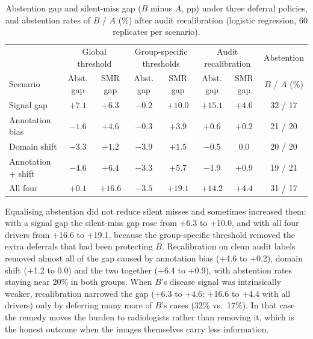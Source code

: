 \begin{table}[t]
\centering
\caption{Abstention gap and silent-miss gap ($B$ minus $A$, pp) under three deferral policies, and abstention rates of $B$ / $A$ (\%) after audit recalibration (logistic regression, 60 replicates per scenario).}
\label{tab:mitig}
\footnotesize
\begin{tabular}{@{}lccccccc@{}}
\toprule
 & \multicolumn{2}{c}{Global threshold} & \multicolumn{2}{c}{Group-specific thresholds} & \multicolumn{2}{c}{Audit recalibration} & Abstention \\
Scenario & Abst. gap & SMR gap & Abst. gap & SMR gap & Abst. gap & SMR gap & $B$ / $A$ (\%) \\
\midrule
Signal gap & $+7.1$ & $+6.3$ & $-0.2$ & $+10.0$ & $+15.1$ & $+4.6$ & 32 / 17 \\
Annotation bias & $-1.6$ & $+4.6$ & $-0.3$ & $+3.9$ & $+0.6$ & $+0.2$ & 21 / 20 \\
Domain shift & $-3.3$ & $+1.2$ & $-3.9$ & $+1.5$ & $-0.5$ & $0.0$ & 20 / 20 \\
Annotation + shift & $-4.6$ & $+6.4$ & $-3.3$ & $+5.7$ & $-1.9$ & $+0.9$ & 19 / 21 \\
All four & $+0.1$ & $+16.6$ & $-3.5$ & $+19.1$ & $+14.2$ & $+4.4$ & 31 / 17 \\
\bottomrule
\end{tabular}
\end{table}

Equalising abstention did not reduce silent misses and sometimes increased them: with a signal gap the silent-miss gap rose from +6.3 to +10.0\pp, and with all four drivers from +16.6 to +19.1\pp, because the group-specific threshold removed the extra deferrals that had been protecting $B$. Recalibration on clean audit labels removed almost all of the gap caused by annotation bias (+4.6 to +0.2\pp), domain shift (+1.2 to 0.0\pp) and the two together (+6.4 to +0.9\pp), with abstention rates staying near 20\% in both groups. When $B$'s disease signal was intrinsically weaker, recalibration narrowed the gap (+6.3 to +4.6\pp; +16.6 to +4.4\pp{} with all drivers) only by deferring many more of $B$'s cases (32\% vs.\ 17\%). In that case the remedy moves the burden to radiologists rather than removing it, which is the honest outcome when the images themselves carry less information.

